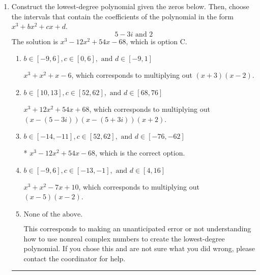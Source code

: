 \documentclass{extbook}[14pt]
\newcommand{\litem}[1]{\item #1

\rule{\textwidth}{0.4pt}}
\begin{document}
\begin{enumerate}\litem{
Construct the lowest-degree polynomial given the zeros below. Then, choose the intervals that contain the coefficients of the polynomial in the form $x^3+bx^2+cx+d$.
\[ 5 - 3 i \text{ and } 2 \]The solution is \( x^{3} -12 x^{2} +54 x -68 \), which is option C.\begin{enumerate}[label=\Alph*.]
\item \( b \in [-9, 6], c \in [0, 6], \text{ and } d \in [-9, 1] \)

$x^{3} + x^{2} +x -6$, which corresponds to multiplying out $(x + 3)(x -2)$.
\item \( b \in [10, 13], c \in [52, 62], \text{ and } d \in [68, 76] \)

$x^{3} +12 x^{2} +54 x + 68$, which corresponds to multiplying out $(x-(5 - 3 i))(x-(5 + 3 i))(x + 2)$.
\item \( b \in [-14, -11], c \in [52, 62], \text{ and } d \in [-76, -62] \)

* $x^{3} -12 x^{2} +54 x -68$, which is the correct option.
\item \( b \in [-9, 6], c \in [-13, -1], \text{ and } d \in [4, 16] \)

$x^{3} + x^{2} -7 x + 10$, which corresponds to multiplying out $(x -5)(x -2)$.
\item \( \text{None of the above.} \)

This corresponds to making an unanticipated error or not understanding how to use nonreal complex numbers to create the lowest-degree polynomial. If you chose this and are not sure what you did wrong, please contact the coordinator for help.
\end{enumerate}

}
\end{enumerate}
\end{document}
